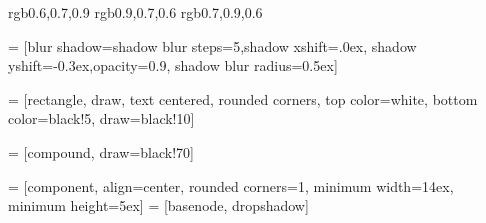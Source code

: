 \definecolor{usercolor}   {rgb}{0.6,0.7,0.9}
\definecolor{kernelcolor} {rgb}{0.9,0.7,0.6}
\definecolor{guestcolor}  {rgb}{0.7,0.9,0.6}

 = [blur shadow={shadow blur steps=5,shadow xshift=.0ex,
                                       shadow yshift=-0.3ex,opacity=0.9,
                                       shadow blur radius=0.5ex}]

 = [rectangle, draw, text centered,
                        rounded corners,
                        top color=white,
                        bottom color=black!5,
                        draw=black!10]

 = [compound, draw=black!70]

 = [component, align=center,
                        rounded corners=1, minimum width=14ex,
                        minimum height=5ex]
 = [basenode, dropshadow]
